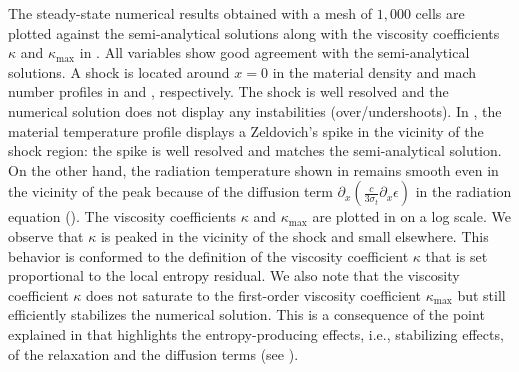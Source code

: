 \documentclass[times,doublespace]{fldauth}%
\begin{document}
The steady-state numerical results obtained with a mesh of $1,000$ cells are plotted against the semi-analytical solutions %
along with the viscosity coefficients $\kappa$ and $\kappa_\text{max}$ in . All variables show good agreement with the semi-analytical solutions. A shock is located around $x=0$ in the material density and mach number profiles in  and , respectively. The shock is well resolved and the numerical solution does not display any instabilities (over/undershoots). In , the material temperature profile displays a Zeldovich's spike in the vicinity of the shock region: the spike is well resolved and matches the semi-analytical solution. On the other hand, the radiation temperature shown in  remains smooth even in the vicinity of the peak because of the diffusion term $ \partial_x \left( \frac{c}{3 \sigma_t} \partial_x \epsilon \right)$ in the radiation equation (). The viscosity coefficients $\kappa$ and $\kappa_\text{max}$ are plotted in  on a log scale. We observe that $\kappa$ is peaked in the vicinity of the shock and small elsewhere. This behavior is conformed to the definition of the viscosity coefficient $\kappa$ that is set proportional to the local entropy residual. We also note that the viscosity coefficient $\kappa$ does not saturate to the first-order viscosity coefficient $\kappa_\text{max}$ but still efficiently stabilizes the numerical solution. This is a consequence of the point explained in  that highlights the entropy-producing effects, i.e., stabilizing effects, of the relaxation and the diffusion terms (see ). 
\end{document}

